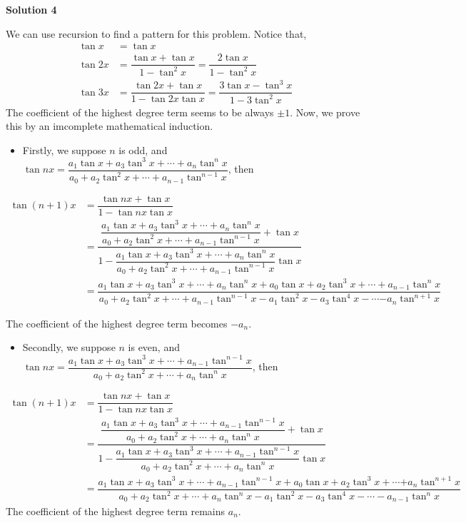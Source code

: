 \begin{enumerate}
\textbf{Solution 4}

We can use recursion to find a pattern for this problem. Notice that,
 \begin{align*} \tan x &= \tan x\\ \tan 2x &= \dfrac{\tan x + \tan x}{1 - \tan^2 x} = \dfrac{2\tan x}{1 - \tan^2 x}\\ \tan 3x &= \dfrac{\tan 2x + \tan x}{1 - \tan 2x \tan x} = \dfrac{3\tan x - \tan^3 x}{1 - 3\tan^2 x} \end{align*}
The coefficient of the highest degree term seems to be always $\pm 1$. Now, we prove this by an imcomplete  mathematical induction.

 
            \begin{itemize}
        \item Firstly, we suppose $n$ is odd, and $\tan nx = \dfrac{a_1\tan x + a_3\tan^3 x + \cdots + a_n\tan^n x}{a_0 + a_2\tan^2 x + \cdots + a_{n - 1}\tan^{n - 1} x}$, then
            \end{itemize}
            
 \begin{align*} \tan(n + 1)x &= \dfrac{\tan nx + \tan x}{1 - \tan nx \tan x}\\ &= \dfrac{\dfrac{a_1\tan x + a_3\tan^3 x + \cdots + a_n\tan^n x}{a_0 + a_2\tan^2 x + \cdots + a_{n - 1}\tan^{n - 1} x} + \tan x}{1 - \dfrac{a_1\tan x + a_3\tan^3 x + \cdots + a_n\tan^n x}{a_0 + a_2\tan^2 x + \cdots + a_{n - 1}\tan^{n - 1} x}\tan x}\\ &= \dfrac{a_1\tan x + a_3\tan^3 x + \cdots + a_n\tan^n x + a_0\tan x + a_2\tan^3 x + \cdots + a_{n - 1}\tan^n x}{a_0 + a_2\tan^2x + \cdots + a_{n - 1}\tan^{n - 1}x - a_1\tan^2 x - a_3\tan^4 x - \cdots \boxed{-a_n\tan^{n + 1} x}} \end{align*}


 The coefficient of the highest degree term becomes $-a_n$.

 
            \begin{itemize}
        \item Secondly, we suppose $n$ is even, and $\tan nx = \dfrac{a_1\tan x + a_3\tan^3 x + \cdots + a_{n - 1}\tan^{n - 1} x}{a_0 + a_2\tan^2 x + \cdots + a_n\tan^n x}$, then
            \end{itemize}
            
 \begin{align*} \tan(n + 1)x &= \dfrac{\tan nx + \tan x}{1 - \tan nx \tan x}\\ &= \dfrac{\dfrac{a_1\tan x + a_3\tan^3 x + \cdots + a_{n - 1}\tan^{n - 1} x}{a_0 + a_2\tan^2 x + \cdots + a_n\tan^n x} + \tan x}{1 - \dfrac{a_1\tan x + a_3\tan^3 x + \cdots + a_{n - 1}\tan^{n - 1} x}{a_0 + a_2\tan^2 x + \cdots + a_n\tan^n x}\tan x}\\ &= \dfrac{a_1\tan x + a_3\tan^3 x + \cdots + a_{n - 1}\tan^{n - 1} x + a_0\tan x + a_2\tan^3 x + \cdots \boxed{+ a_n\tan^{n + 1} x}}{a_0 + a_2\tan^2 x + \cdots + a_n\tan^n x - a_1\tan^2 x - a_3\tan^4 x - \cdots - a_{n - 1}\tan^n x} \end{align*}
The coefficient of the highest degree term remains $a_n$.


\end{enumerate}
